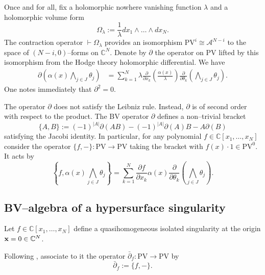\documentclass[12pt,a4paper]{amsart}
\newcommand{\CC}{{\mathbb{C}}}
\newcommand{\bx}{{\bf x}}
\def\A{{\mathcal A}}
\newcommand{\p}{{\partial}}
\newcommand{\<}{\left<}
\renewcommand{\>}{\right>}
\newcommand{\PV}{{\mathrm{PV}}}
\numberwithin{equation}{section}
\begin{document}
Once and for all, fix a holomorphic nowhere vanishing function $\lambda$ and a holomorphic volume form
\[
    \Omega_\lambda := \frac{1}{\lambda} dx_1\wedge \dots \wedge dx_N.
\]
The contraction operator $\vdash \Omega_\lambda$ provides an isomorphism $\PV^{i} \cong \A^{N-i}$ to the space of ${(N-i,0)}$--forms on $\CC^N$. Denote by $\p$ the operator on $\PV$ lifted by this isomorphism from the Hodge theory holomorphic differential. We have
\begin{align*}
    \p \left( \alpha(x) \bigwedge_{j \in J} \theta_{j} \right)  &=
    \sum_{k=1}^N \lambda \frac{\p }{\p x_k} \left( \frac{\alpha(x)}{\lambda} \right)  \frac{\p}{\p \theta_k} \left( \bigwedge_{j \in J} \theta_{j} \right).
\end{align*}
One notes immediately that $\p^2 = 0$.

The operator $\p$ does not satisfy the Leibniz rule. Instead, $\p$ is of second order with respect to the product.
The BV operator $\p$ defines a non--trivial bracket
\[
 \lbrace A, B \rbrace := (-1)^{|A|} \p(A B) - (-1)^{|A|} \p(A) B - A \p(B)
\]
satisfying the Jacobi identity. In particular, for any polynomial $f \in \CC[x_1,\dots,x_N]$ consider the operator $\lbrace f, - \rbrace : \PV \to \PV$ taking the bracket with $f(x) \cdot 1 \in \PV^{0}$. It acts by
\begin{equation}\label{eq: bracket with f}
 \left\lbrace f, \alpha(x) \bigwedge_{j \in J} \theta_{j} \right\rbrace
 = \sum_{k=1}^N \frac{\p f}{\p x_k} \alpha(x) \frac{\p}{\p \theta_k} ( \bigwedge_{j \in J} \theta_{j} ).
\end{equation}

\subsection{BV--algebra of a hypersurface singularity}\label{section: BV of a singulariy}
Let $f \in \CC[x_1,\dots,x_N]$ define a quasihomogeneous isolated singularity at the origin $\bx = 0 \in \CC^N$.

Following \cite{LLS}, associate to it the operator $\bar\p_f : \PV \to \PV$ by
\[
    \bar \p_f := \lbrace f, - \rbrace.
\]
\end{document}

